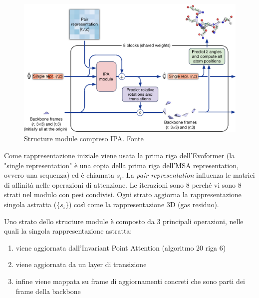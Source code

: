 \begin{figure}[!htb]
	\centering
	\includegraphics[scale=0.4]{images/structure-module-ipa.png}
	\caption{Structure module compreso IPA. Fonte\cite{jumper2021highly}}
	\label{fig:struct-ipa}
\end{figure}

\par Come rappresentazione iniziale viene usata la prima riga dell'Evoformer (la "single representation" è una copia della prima riga dell'MSA representation, ovvero una sequenza) ed è chiamata $s_{i}$. La \textit{pair representation} influenza le matrici di affinità nelle operazioni di attenzione. Le iterazioni sono 8 perché vi sono 8 strati nel modulo con pesi condivisi. Ogni strato aggiorna la rappresentazione singola astratta ($\{s_{i}\}$) così come la rappresentazione 3D (gas residuo).

\par Uno strato dello structure module è composto da 3 principali operazioni, nelle quali la singola rappresentazione astratta: 

\begin{enumerate}
	\item viene aggiornata dall'Invariant Point Attention (algoritmo 20 riga 6) 
	\item viene aggiornata da un layer di transizione
	\item infine viene mappata su frame di aggiornamenti concreti che sono parti dei frame della backbone
\end{enumerate}

